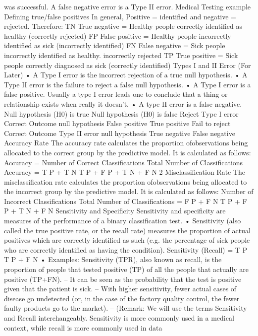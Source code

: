 \documentclass[a4paper,12pt]{article}
\begin{document}
was successful. A false negative error is a Type II error.
Medical Testing example Defining true/false positives
In general, Positive = identified and negative = rejected. Therefore:
TN True negative = Healthy people correctly identified as healthy (correctly rejected)
FP False positive = Healthy people incorrectly identified as sick (incorrectly identified)
FN False negative = Sick people incorrectly identified as healthy. incorrectly rejected
TP True positive = Sick people correctly diagnosed as sick (correctly identified)
Types I and II Error (For Later)
• A Type I error is the incorrect rejection of a true null hypothesis.
• A Type II error is the failure to reject a false null hypothesis.
• A Type I error is a false positive. Usually a type I error leads one to conclude that a thing
or relationship exists when really it doesn’t.
• A type II error is a false negative.
Null hypothesis (H0) is true Null hypothesis (H0) is false
Reject Type I error Correct Outcome
null hypothesis False positive True positive
Fail to reject Correct Outcome Type II error
null hypothesis True negative False negative
Accuracy Rate
The accuracy rate calculates the proportion ofobservations being allocated to the correct group
by the predictive model. It is calculated as follows:
Accuracy = Number of Correct Classifications
Total Number of Classifications
Accuracy = T P + T N
T P + F P + T N + F N
2
Misclassification Rate
The misclassification rate calculates the proportion ofobservations being allocated to the incorrect
group by the predictive model. It is calculated as follows:
Number of Incorrect Classifications
Total Number of Classifications
=
F P + F N
T P + F P + T N + F N
Sensitivity and Specificity
Sensitivity and specificity are measures of the performance of a binary classification test.
• Sensitivity (also called the true positive rate, or the recall rate) measures the proportion
of actual positives which are correctly identified as such (e.g. the percentage of sick people
who are correctly identified as having the condition).
Sensitivity (Recall) = T P
T P + F N
• Examples: Sensitivity (TPR), also known as recall, is the proportion of people that tested
positive (TP) of all the people that actually are positive (TP+FN).
– It can be seen as the probability that the test is positive given that the patient is sick.
– With higher sensitivity, fewer actual cases of disease go undetected (or, in the case of
the factory quality control, the fewer faulty products go to the market).
– (Remark: We will use the terms Sensitivity and Recall interchangeably. Sensitivity is
more commonly used in a medical context, while recall is more commonly used in data
\end{document}
